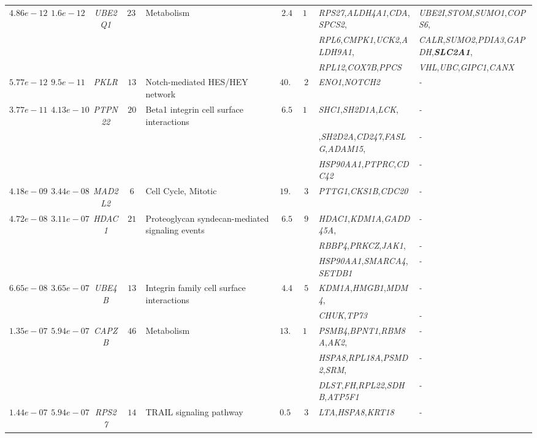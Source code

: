 \documentclass[10pt]{article}
\begin{document}
{\begin{landscape}
\begin{table}[!htbp]
{\begin{tabular}{c c c c l c c l l}
$4.86e-12$ & $1.6e-12$ & \textit{UBE2Q1} & $234$ & Metabolism & $2.4$ & $11$ & \textit{RPS27},\textit{ALDH4A1},\textit{CDA},\textit{SPCS2}, & \textit{UBE2I},\textit{STOM},\textit{SUMO1},\textit{COPS6},\tabularnewline
& & & & & & &\textit{RPL6},\textit{CMPK1},\textit{UCK2},\textit{ALDH9A1},&\textit{CALR},\textit{SUMO2},\textit{PDIA3},\textit{GAPDH},\textbf{\textit{SLC2A1}},\tabularnewline
& & & & & & &\textit{RPL12},\textit{COX7B},\textit{PPCS} & \textit{VHL},\textit{UBC},\textit{GIPC1},\textit{CANX} \tabularnewline
$5.77e-12$ & $9.5e-11$ & \textit{PKLR} & $13$ & Notch-mediated HES/HEY network & $40.4$ & $2$ & \textit{ENO1},\textit{NOTCH2}&\textit{-} \tabularnewline

$3.77e-11$ & $4.13e-10$ & \textit{PTPN22} & $20$ & Beta1 integrin cell surface interactions & $6.5$ & $10$ & \textit{SHC1},\textit{SH2D1A},\textit{LCK}, & \textit{-} \tabularnewline

& & & & & & &,\textit{SH2D2A},\textit{CD247},\textit{FASLG},\textit{ADAM15}, & \textit{-} \tabularnewline
& & & & & & &\textit{HSP90AA1},\textit{PTPRC},\textit{CDC42}&\textit{-} \tabularnewline

$4.18e-09$ & $3.44e-08$ & \textit{MAD2L2} & $6$ & Cell Cycle, Mitotic & $19.2$ & $3$ & \textit{PTTG1},\textit{CKS1B},\textit{CDC20}&\textit{-} \tabularnewline
$4.72e-08$ & $3.11e-07$ & \textit{HDAC1} & $21$ & Proteoglycan syndecan-mediated signaling events & $6.5$ & $9$ & \textit{HDAC1},\textit{KDM1A},\textit{GADD45A},&\textit{-} \tabularnewline

& & & & & & &\textit{RBBP4},\textit{PRKCZ},\textit{JAK1},&\textit{-} \tabularnewline

& & & & & & &\textit{HSP90AA1},\textit{SMARCA4},\textit{SETDB1}&\textit{-} \tabularnewline

$6.65e-08$ & $3.65e-07$ & \textit{UBE4B} & $13$ & Integrin family cell surface interactions & $4.4$ & $5$ & \textit{KDM1A},\textit{HMGB1},\textit{MDM4},&\textit{-} \tabularnewline
& & & & & & &\textit{CHUK},\textit{TP73}&\textit{-} \tabularnewline

$1.35e-07$ & $5.94e-07$ & \textit{CAPZB} & $46$ & Metabolism & $13.01$ & $13$ & \textit{PSMB4},\textit{BPNT1},\textit{RBM8A},\textit{AK2},&\textit{-} \tabularnewline
& & & & & & &\textit{HSPA8},\textit{RPL18A},\textit{PSMD2},\textit{SRM},&\textit{-} \tabularnewline
& & & & & & &\textit{DLST},\textit{FH},\textit{RPL22},\textit{SDHB},\textit{ATP5F1}&\textit{-} \tabularnewline
$1.44e-07$ & $5.94e-07$ & \textit{RPS27} & $14$ & TRAIL signaling pathway & $0.55$ & $3$ & \textit{LTA},\textit{HSPA8},\textit{KRT18}&\textit{-} \tabularnewline


\end{tabular}}
\end{table}
\end{landscape}}
\end{document}
